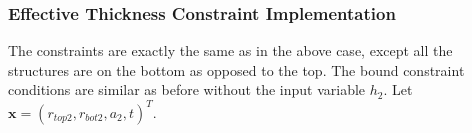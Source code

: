 \documentclass[12pt]{article}
\numberwithin{equation}{section}
\numberwithin{equation}{section}
\begin{document}

\subsubsection{Effective Thickness Constraint Implementation}
The constraints are exactly the same as in the above case, except all the structures are on the bottom as opposed to the top.
The bound constraint conditions are similar as before without the input variable $h_2$.  
Let $\mathbf{x} = \left ( r_{top2}, r_{bot2}, a_2, t  \right )^T $.
\end{document}
